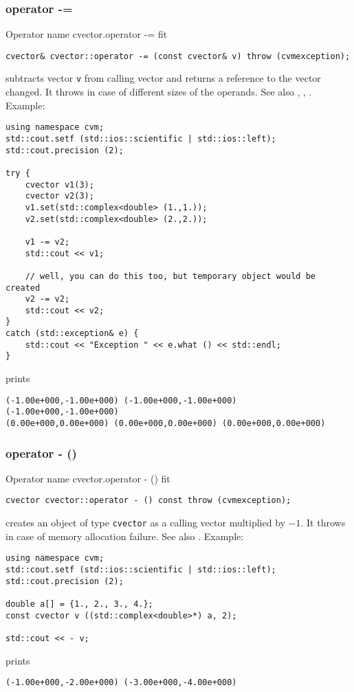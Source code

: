 \subsubsection{operator -=}
Operator%
\pdfdest name {cvector.operator -=} fit
\begin{verbatim}
cvector& cvector::operator -= (const cvector& v) throw (cvmexception);
\end{verbatim}
subtracts vector \verb"v" from  calling vector  
and returns a reference to
the vector changed.
It throws  
in case of different sizes of the operands.
See also ,
,
.
Example:
\begin{Verbatim}
using namespace cvm;
std::cout.setf (std::ios::scientific | std::ios::left);
std::cout.precision (2);

try {
    cvector v1(3);
    cvector v2(3);
    v1.set(std::complex<double> (1.,1.));
    v2.set(std::complex<double> (2.,2.));

    v1 -= v2;
    std::cout << v1;

    // well, you can do this too, but temporary object would be created
    v2 -= v2;
    std::cout << v2;
}
catch (std::exception& e) {
    std::cout << "Exception " << e.what () << std::endl;
}
\end{Verbatim}
prints
\begin{Verbatim}
(-1.00e+000,-1.00e+000) (-1.00e+000,-1.00e+000) (-1.00e+000,-1.00e+000)
(0.00e+000,0.00e+000) (0.00e+000,0.00e+000) (0.00e+000,0.00e+000)
\end{Verbatim}
\newpage



\subsubsection{operator - ()}
Operator%
\pdfdest name {cvector.operator - ()} fit
\begin{verbatim}
cvector cvector::operator - () const throw (cvmexception);
\end{verbatim}
creates an object of type \verb"cvector" as
a calling  vector multiplied by $-1$.
It throws  
in case of memory allocation failure.
See also .
Example:
\begin{Verbatim}
using namespace cvm;
std::cout.setf (std::ios::scientific | std::ios::left);
std::cout.precision (2);

double a[] = {1., 2., 3., 4.};
const cvector v ((std::complex<double>*) a, 2);

std::cout << - v;
\end{Verbatim}
prints
\begin{Verbatim}
(-1.00e+000,-2.00e+000) (-3.00e+000,-4.00e+000)
\end{Verbatim}
\newpage



